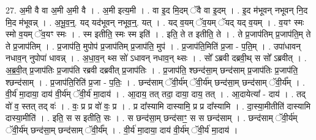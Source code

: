 \documentclass[17pt]{extarticle}
\begin{document}
27. अ॒मी वै वा अ॒मी अ॒मी वै । . अ॒मी इत्य॒मी । . वा इ॒द मि॒दम् ॅवै वा इ॒दम् । . इ॒द म॑भूवन् नभूवन् नि॒द मि॒द म॑भूवन्न् । . अ॒भू॒व॒न्॒. यद् यद॑भूवन् नभूव॒न्॒. यत् । . यद् व॒यम् ॅव॒यम् ॅयद् यद् व॒यम् । . व॒यꣳ स्मः स्मो व॒यम् ॅव॒यꣳ स्मः । . स्म इतीति॒ स्मः स्म इति॑ । . इति॒ ते त इतीति॒ ते । . ते प्र॒जाप॑तिम् प्र॒जाप॑ति॒म् ते ते प्र॒जाप॑तिम् । . प्र॒जाप॑ति॒ मुपोप॑ प्र॒जाप॑तिम् प्र॒जाप॑ति॒ मुप॑ । . प्र॒जाप॑ति॒मिति॑ प्र॒जा - प॒ति॒म् । . उपा॑धावन् नधाव॒न् नुपोपा॑ धावन्न् । . अ॒धा॒व॒न् थ्स सो॑ ऽधावन् नधाव॒न् थ्सः । . सो᳚ ऽब्रवी दब्रवी॒थ् स सो᳚ ऽब्रवीत् । . अ॒ब्र॒वी॒त् प्र॒जाप॑तिः प्र॒जाप॑ति रब्रवी दब्रवीत् प्र॒जाप॑तिः । . प्र॒जाप॑ति॒ श्छन्द॑सा॒म् छन्द॑साम् प्र॒जाप॑तिः प्र॒जाप॑ति॒ श्छन्द॑साम् । . प्र॒जाप॑ति॒रिति॑ प्र॒जा - प॒तिः॒ । . छन्द॑साम् ॅवी॒र्य॑म् ॅवी॒र्य॑म् छन्द॑सा॒म् छन्द॑साम् ॅवी॒र्य᳚म् । . वी॒र्य॑ मा॒दाया॒ दाय॑ वी॒र्य॑म् ॅवी॒र्य॑ मा॒दाय॑ । . आ॒दाय॒ तत् तदा॒ दाया॒ दाय॒ तत् । . आ॒दायेत्या᳚ - दाय॑ । . तद् वो॑ व॒ स्तत् तद् वः॑ । . वः॒ प्र प्र वो॑ वः॒ प्र । . प्र दा᳚स्यामि दास्यामि॒ प्र प्र दा᳚स्यामि । . दा॒स्या॒मीतीति॑ दास्यामि दास्या॒मीति॑ । . इति॒ स स इतीति॒ सः । . स छन्द॑सा॒म् छन्द॑साꣳ॒॒ स स छन्द॑साम् । . छन्द॑साम् ॅवी॒र्य॑म् ॅवी॒र्य॑म् छन्द॑सा॒म् छन्द॑साम् ॅवी॒र्य᳚म् । . वी॒र्य॑ मा॒दाया॒ दाय॑ वी॒र्य॑म् ॅवी॒र्य॑ मा॒दाय॑ । \newline
\end{document}
